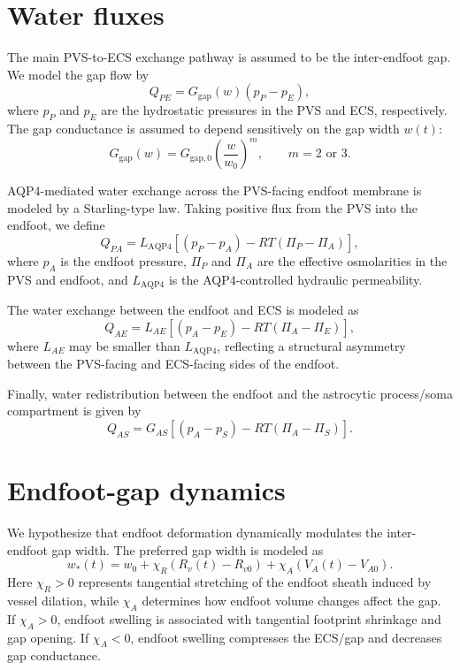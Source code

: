 \documentclass{article}
\begin{document}
\section{Water fluxes}

The main PVS-to-ECS exchange pathway is assumed to be the inter-endfoot gap. We model the gap flow by
\begin{equation}
    Q_{PE}
    =
    G_{\mathrm{gap}}(w)(p_P-p_E),
\end{equation}
where \(p_P\) and \(p_E\) are the hydrostatic pressures in the PVS and ECS, respectively. The gap
conductance is assumed to depend sensitively on the gap width \(w(t)\):
\begin{equation}
    G_{\mathrm{gap}}(w)
    =
    G_{\mathrm{gap},0}
    \left(
    \frac{w}{w_0}
    \right)^m,
    \qquad m=2 \text{ or }3.
\end{equation}

AQP4-mediated water exchange across the PVS-facing endfoot membrane is modeled by a Starling-type law.
Taking positive flux from the PVS into the endfoot, we define
\begin{equation}
    Q_{PA}
    =
    L_{\mathrm{AQP4}}
    \left[
    (p_P-p_A)
    -
    RT(\Pi_P-\Pi_A)
    \right],
\end{equation}
where \(p_A\) is the endfoot pressure, \(\Pi_P\) and \(\Pi_A\) are the effective osmolarities in the PVS
and endfoot, and \(L_{\mathrm{AQP4}}\) is the AQP4-controlled hydraulic permeability.

The water exchange between the endfoot and ECS is modeled as
\begin{equation}
    Q_{AE}
    =
    L_{AE}
    \left[
    (p_A-p_E)
    -
    RT(\Pi_A-\Pi_E)
    \right],
\end{equation}
where \(L_{AE}\) may be smaller than \(L_{\mathrm{AQP4}}\), reflecting a structural asymmetry between the
PVS-facing and ECS-facing sides of the endfoot.

Finally, water redistribution between the endfoot and the astrocytic process/soma compartment is given by
\begin{equation}
    Q_{AS}
    =
    G_{AS}
    \left[
    (p_A-p_S)
    -
    RT(\Pi_A-\Pi_S)
    \right].
\end{equation}

\section{Endfoot-gap dynamics}

We hypothesize that endfoot deformation dynamically modulates the inter-endfoot gap width. The preferred
gap width is modeled as
\begin{equation}
    w_*(t)
    =
    w_0
    +
    \chi_R\left(R_v(t)-R_{v0}\right)
    +
    \chi_A\left(V_A(t)-V_{A0}\right).
\end{equation}
Here \(\chi_R>0\) represents tangential stretching of the endfoot sheath induced by vessel dilation,
while \(\chi_A\) determines how endfoot volume changes affect the gap. If \(\chi_A>0\), endfoot swelling
is associated with tangential footprint shrinkage and gap opening. If \(\chi_A<0\), endfoot swelling
compresses the ECS/gap and decreases gap conductance.
\end{document}
